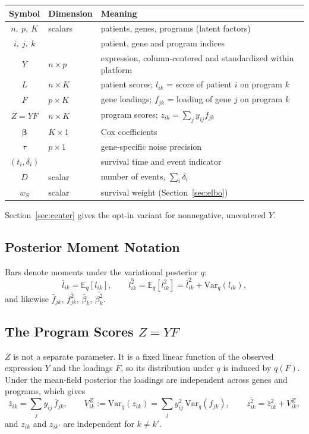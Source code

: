 \documentclass[11pt]{article}
\newcommand{\lbar}[2]{\bar{l}_{#1#2}}
\newcommand{\fbar}[2]{\bar{f}_{#1#2}}
\newcommand{\zbar}[2]{\bar{z}_{#1#2}}
\newcommand{\betabar}[1]{\bar{\beta}_{#1}}
\newcommand{\lsec}[2]{\overline{l^2_{#1#2}}}
\newcommand{\fsec}[2]{\overline{f^2_{#1#2}}}
\newcommand{\zsec}[2]{\overline{z^2_{#1#2}}}
\newcommand{\betasec}[1]{\overline{\beta^2_{#1}}}
\newcommand{\E}{\mathbb{E}_q}
\newcommand{\Var}{\mathrm{Var}_q}
\newcommand{\ws}{w_S}
\begin{document}
\begin{center}
\begin{tabular}{cll}
\toprule
Symbol & Dimension & Meaning \\
\midrule
$n,\ p,\ K$ & scalars & patients, genes, programs (latent factors) \\
$i,\ j,\ k$ & & patient, gene and program indices \\
$Y$ & $n\times p$ & expression, column-centered and standardized within platform \\
$L$ & $n\times K$ & patient scores; $l_{ik}$ = score of patient $i$ on program $k$ \\
$F$ & $p\times K$ & gene loadings; $f_{jk}$ = loading of gene $j$ on program $k$ \\
$Z = YF$ & $n\times K$ & program scores; $z_{ik} = \sum_j y_{ij} f_{jk}$ \\
$\bm{\beta}$ & $K\times 1$ & Cox coefficients \\
$\tau$ & $p\times 1$ & gene-specific noise precision \\
$(t_i,\delta_i)$ & & survival time and event indicator \\
$D$ & scalar & number of events, $\sum_i\delta_i$ \\
$\ws$ & scalar & survival weight (Section~\ref{sec:elbo}) \\
\bottomrule
\end{tabular}
\end{center}
Section~\ref{sec:center} gives the opt-in variant for nonnegative, uncentered $Y$.

\subsection{Posterior Moment Notation}

Bars denote moments under the variational posterior $q$:
\[
  \lbar{i}{k} = \E[l_{ik}], \qquad
  \lsec{i}{k} = \E[l_{ik}^2] = \lbar{i}{k}^2 + \Var(l_{ik}),
\]
and likewise $\fbar{j}{k}$, $\fsec{j}{k}$, $\betabar{k}$, $\betasec{k}$.

\subsection{The Program Scores $Z = YF$}

$Z$ is not a separate parameter. It is a fixed linear function of the observed
expression $Y$ and the loadings $F$, so its distribution under $q$ is induced by
$q(F)$. Under the mean-field posterior the loadings are independent across genes
and programs, which gives
\begin{equation}\label{eq:z-moments}
  \zbar{i}{k} = \sum_j y_{ij}\,\fbar{j}{k}, \qquad
  V^Z_{ik} := \Var(z_{ik}) = \sum_j y_{ij}^2\,\Var(f_{jk}), \qquad
  \zsec{i}{k} = \zbar{i}{k}^2 + V^Z_{ik},
\end{equation}
and $z_{ik}$ and $z_{ik'}$ are independent for $k\ne k'$.
\end{document}
